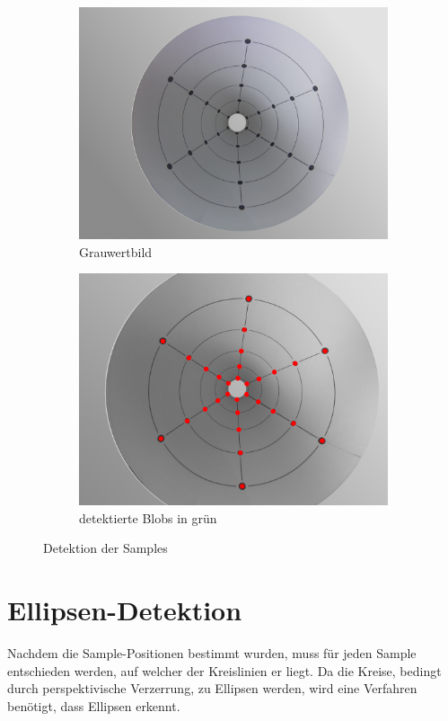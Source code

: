 \begin{figure}[!htb]
	\centering
	\begin{subfigure}{.5\textwidth}
		\centering
		\includegraphics[width=.9\textwidth]{images/coneRasp.jpg}
		\caption{Grauwertbild}
	\end{subfigure}%
	\begin{subfigure}{.5\textwidth}
		\centering
		\includegraphics[width=.9\textwidth]{images/coneRaspDetectedDots.png}
		\caption{detektierte Blobs in grün}
	\end{subfigure}
	\caption{Detektion der Samples}
	\label{fig:blobDetect}
\end{figure}


\section{Ellipsen-Detektion}
\label{s:ellipseDetection}
Nachdem die Sample-Positionen bestimmt wurden, muss für jeden Sample entschieden werden, auf welcher der Kreislinien er liegt. Da die Kreise, bedingt durch perspektivische Verzerrung, zu  Ellipsen werden, wird eine Verfahren 
benötigt, dass Ellipsen erkennt. 

